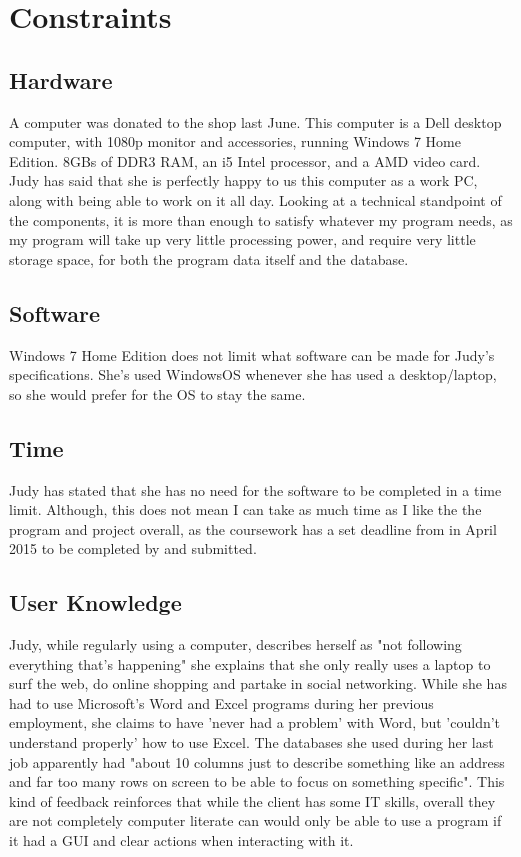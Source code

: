 \section{Constraints}

\subsection{Hardware}
A computer was donated to the shop last June. This computer is a Dell desktop computer, with 1080p monitor and accessories, running Windows 7 Home Edition. 8GBs of DDR3 RAM, an i5 Intel processor, and a AMD video card. Judy has said that she is perfectly happy to us this computer as a work PC, along with being able to work on it all day. Looking at a technical standpoint of the components, it is more than enough to satisfy whatever my program needs, as my program will take up very little processing power, and require very little storage space, for both the program data itself and the database.

\subsection{Software}
Windows 7 Home Edition does not limit what software can be made for Judy's specifications. She's used WindowsOS whenever she has used a desktop/laptop, so she would prefer for the OS to stay the same.

\subsection{Time}
Judy has stated that she has no need for the software to be completed in a time limit. Although, this does not mean I can take as much time as I like the the program and project overall, as the coursework has a set deadline from in April 2015 to be completed by and submitted.
\subsection{User Knowledge}
Judy, while regularly using a computer, describes herself as "not following everything that’s happening" she explains that she only really uses a laptop to surf the web, do online shopping and partake in social networking. While she has had to use Microsoft's Word and Excel programs during her previous employment, she claims to have 'never had a problem' with Word, but 'couldn't understand properly' how to use Excel. The databases she used during her last job apparently had "about 10 columns just to describe something like an address and far too many rows on screen to be able to focus on something specific". This kind of feedback reinforces that while the client has some IT skills, overall they are not completely computer literate can would only be able to use a program if it had a GUI and clear actions when interacting with it.

